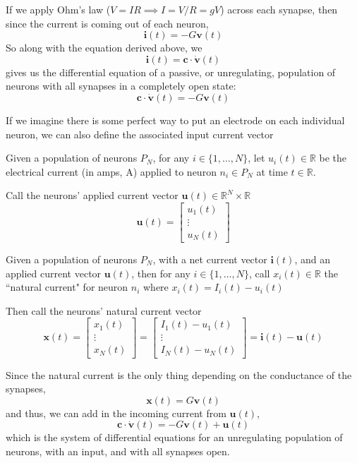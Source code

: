 \documentclass{article}
\begin{document}
If we apply Ohm's law ($V=IR\implies I=V/R=gV$) across each synapse, then since the current is coming out of each neuron,
\[ \mathbf{i}(t) = -G\mathbf{v}(t) \]
So along with the equation derived above, we
\[ \mathbf{i}(t) = \mathbf{c}\cdot\dot{\mathbf{v}}(t) \]
gives us the differential equation of a passive, or unregulating, population of neurons with all synapses in a completely open state:
\[ \boxed{ \mathbf{c}\cdot\dot{\mathbf{v}}(t) = -G\mathbf{v}(t) } \]

If we imagine there is some perfect way to put an electrode on each individual neuron, we can also define the associated input current vector
\begin{definition}[$\mathbf{u}(t) = \textbf{applied current vector}$]\label{u}
Given a population of neurons $P_{N}$, for any $i \in \{ 1, \dots, N \}$, let $u_{i}(t)\in\mathbb{R}$ be the electrical current (in amps, A) applied to neuron $n_{i}\in P_{N}$ at time $t\in\mathbb{R}$.

Call the neurons' applied current vector $\mathbf{u}(t)\in\mathbb{R}^{N}\times\mathbb{R}$
\[ \mathbf{u}(t) =
\begin{bmatrix}
u_{1}(t) \\
\vdots \\
u_{N}(t)
\end{bmatrix} \]
\end{definition}

\begin{definition}[$\mathbf{x}(t) =$ \textbf{natural current vector}]\label{x}
Given a population of neurons $P_{N}$, with a net current vector $\mathbf{i}(t)$, and an applied current vector $\mathbf{u}(t)$, then for any $i \in \{ 1, \dots, N \}$, call $x_{i}(t)\in\mathbb{R}$ the ``natural current" for neuron $n_{i}$ where $x_{i}(t) = I_{i}(t) - u_{i}(t)$

Then call the neurons' natural current vector
\[ \mathbf{x}(t) =
\begin{bmatrix}
x_{1}(t) \\
\vdots \\
x_{N}(t)
\end{bmatrix}
= 
\begin{bmatrix}
I_{1}(t) - u_{1}(t)\\
\vdots \\
I_{N}(t) - u_{N}(t)
\end{bmatrix}
= \mathbf{i}(t) - \mathbf{u}(t)\]
\end{definition}

Since the natural current is the only thing depending on the conductance of the synapses,
\[ \mathbf{x}(t) = G\mathbf{v}(t) \]
and thus, we can add in the incoming current from $\mathbf{u}(t)$,
\[ \boxed{ \mathbf{c}\cdot\dot{\mathbf{v}}(t) = -G\mathbf{v}(t) + \mathbf{u}(t) } \]
which is the system of differential equations for an unregulating population of neurons, with an input, and with all synapses open.
\end{document}
